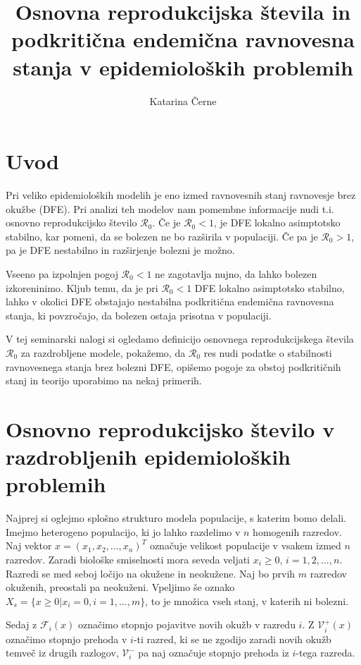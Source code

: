\documentclass[a4paper,12pt]{article}
\newcommand{\todo}[1]{{\color{red}{#1}}}
\newcommand{\R}{\mathcal R}
\newcommand{\F}{\mathcal F}
\newcommand{\V}{\mathcal V}
\begin{document}
\title{Osnovna reprodukcijska števila in podkritična endemična ravnovesna stanja v epidemioloških problemih}
\author{Katarina Černe}
\maketitle

\section{Uvod}

Pri veliko epidemioloških modelih je eno izmed ravnovesnih stanj ravnovesje brez okužbe (DFE). 
Pri analizi teh modelov nam pomembne informacije nudi t.i. osnovno reprodukcijsko 
število \(\R_0\). Če je \(\R_0<1\), je DFE lokalno asimptotsko stabilno, kar pomeni,
da se bolezen ne bo razširila v populaciji. Če pa je \(\R_0>1\), pa je DFE nestabilno
in razširjenje bolezni je možno.

Vseeno pa izpolnjen pogoj \(\R_0<1\) ne zagotavlja nujno, da lahko bolezen izkoreninimo.
Kljub temu, da je pri \(\R_0<1\) DFE lokalno asimptotsko stabilno, lahko v okolici
DFE obstajajo nestabilna podkritična endemična ravnovesna stanja, ki povzročajo, da 
bolezen ostaja prisotna v populaciji. \todo{kaj je res s tem}

V tej seminarski nalogi si ogledamo definicijo osnovnega reprodukcijskega števila 
\(\R_0\) za razdrobljene modele, pokažemo, da \(\R_0\) res nudi podatke o stabilnosti
ravnovesnega stanja brez bolezni DFE, opišemo pogoje za obstoj podkritičnih stanj
in teorijo uporabimo na nekaj primerih.

\section{Osnovno reprodukcijsko število v razdrobljenih epidemioloških problemih}

Najprej si oglejmo splošno strukturo modela populacije, s katerim bomo delali.
Imejmo heterogeno populacijo, ki jo lahko razdelimo v \(n\) homogenih razredov.
Naj vektor \(x=(x_1,x_2,\ldots,x_n)^T\) označuje velikost populacije v vsakem 
izmed \(n\) razredov. Zaradi biološke smiselnosti mora seveda veljati \(x_i\geq 0\),
\(i=1,2,\ldots,n\). Razredi se med seboj ločijo na okužene in neokužene. 
Naj bo prvih \(m\) razredov okuženih, preostali pa neokuženi. Vpeljimo še oznako
\(X_s=\{x\geq 0 | x_i=0, i=1,\ldots, m\}\), to je množica vseh stanj, v katerih
ni bolezni. \todo{nove okužbe}

Sedaj z \(\F_i(x)\) označimo stopnjo pojavitve novih okužb v razredu \(i\). 
Z \(\V^+_i(x)\) označimo stopnjo prehoda v \(i\)-ti razred, ki se ne zgodijo zaradi 
novih okužb temveč iz drugih razlogov, \(\V^-_i\) pa naj označuje stopnjo prehoda
iz \(i\)-tega razreda. 
\end{document}
